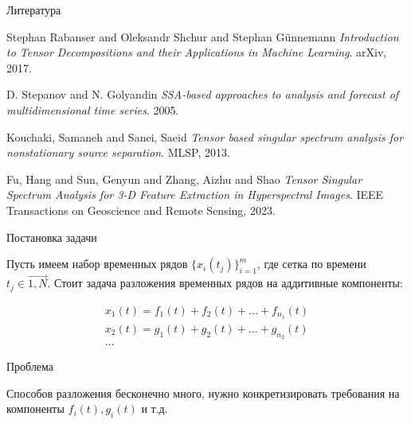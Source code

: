 	\begin{frame}{Литература}
		
		\begin{thebibliography}{1}
			
			Stephan Rabanser and Oleksandr Shchur and Stephan Günnemann
			\textit{Introduction to Tensor Decompositions and their Applications in Machine Learning}.
			arXiv, 2017.
			
			D. Stepanov and N. Golyandin
			\textit{SSA-based approaches to analysis and forecast of multidimensional time series}.
			2005.
			
			Kouchaki, Samaneh and Sanei, Saeid
			\textit{Tensor based singular spectrum analysis for nonstationary source separation}.
			MLSP, 2013.
			
			Fu, Hang and Sun, Genyun and Zhang, Aizhu and Shao
			\textit{Tensor Singular Spectrum Analysis for 3-D Feature Extraction in Hyperspectral Images}.
			IEEE Transactions on Geoscience and Remote Sensing, 2023.
			
		\end{thebibliography}
		
	\end{frame}
	
	\begin{frame}{Постановка задачи}
		
		Пусть имеем набор временных рядов $ \{x_i(t_j)\}_{i = 1}^{m} $, где сетка по времени $ t_j \in \overrightarrow{1, N} $. Стоит задача разложения временных рядов на аддитивные компоненты: 
		
		\begin{gather*}
			x_1(t) = f_1(t) + f_2(t) + \ldots + f_{n_1}(t) \\
			x_2(t) = g_1(t) + g_2(t) + \ldots + g_{n_2}(t) \\
			...
		\end{gather*}
		
			\begin{alertblock}{Проблема}
				
				Способов разложения бесконечно много, нужно конкретизировать требования на компоненты $ f_i(t), g_i(t) $ и т.д.
				
			\end{alertblock}
		
	\end{frame}
	

